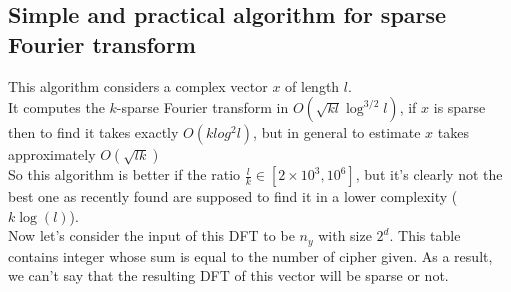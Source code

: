 \documentclass{article}
\begin{document}
\subsection{Simple and practical algorithm for sparse Fourier transform}
This algorithm considers a complex vector $x$ of length $l$.\\
It computes the $k$-sparse Fourier transform in $O(\sqrt{kl}\log^{3/2}l)$, if $x$ is sparse then to find it takes exactly $O(klog^{2}l)$, but in general to estimate $x$ takes approximately $O(\sqrt{lk})$\\
So this algorithm is better if the ratio $\frac{l}{k} \in [2 \times 10^3, 10^6]$, but it's clearly not the best one as recently found are supposed to find it in a lower complexity ($k\log(l)$).\\
Now let's consider the input of this DFT to be $n_y$ with size $2^d$. This table contains integer whose sum is equal to the number of cipher given. As a result, we can't say that the resulting DFT of this vector will be sparse or not.
\end{document}
